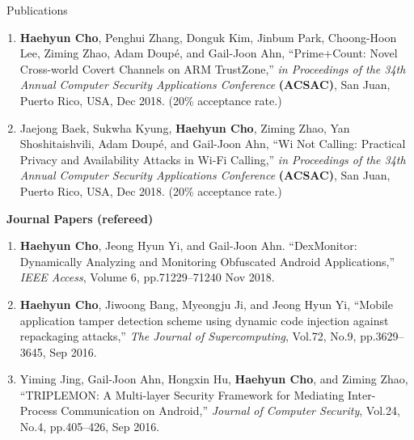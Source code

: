 \documentclass{resume} %
\begin{document}
\begin{rSection}{\faGenderless~Publications}
\begin{enumerate}[leftmargin=0pt]
        \item \textbf{Haehyun Cho}, Penghui Zhang, Donguk Kim, Jinbum Park, Choong-Hoon Lee, Ziming Zhao, Adam Doup\'e, and Gail-Joon Ahn,
		``Prime+Count: Novel Cross-world Covert Channels on ARM TrustZone,'' 
        \emph{in Proceedings of the 34th Annual Computer Security Applications Conference} \textbf{(ACSAC)}, 
		San Juan, Puerto Rico, USA, Dec 2018.
		(20\% acceptance rate.)

		\item Jaejong Baek, Sukwha Kyung, \textbf{Haehyun Cho}, Ziming Zhao, Yan Shoshitaishvili, Adam Doup\'e, and Gail-Joon Ahn,
		``Wi Not Calling: Practical Privacy and Availability Attacks in Wi-Fi Calling,'' 
        \emph{in Proceedings of the 34th Annual Computer Security Applications Conference} \textbf{(ACSAC)}, 
		San Juan, Puerto Rico, USA, Dec 2018.
		(20\% acceptance rate.)

	\end{enumerate}

	\vspace{3mm}
	
    \strut\textbullet~{\bf Journal Papers (refereed)}
    \begin{enumerate}[leftmargin=0pt]
		\item \textbf{Haehyun Cho}, Jeong Hyun Yi, and Gail-Joon Ahn.
        ``DexMonitor: Dynamically Analyzing and Monitoring Obfuscated Android Applications,'' 
        \emph{IEEE Access},
        Volume 6, pp.71229--71240
        Nov 2018.

		\item \textbf{Haehyun Cho}, Jiwoong Bang, Myeongju Ji, and Jeong Hyun Yi, 
		``Mobile application tamper detection scheme using dynamic code injection against repackaging attacks,'' 
		\emph{The Journal of Supercomputing}, 
		Vol.72, No.9, pp.3629--3645, Sep 2016.

		\item Yiming Jing, Gail-Joon Ahn, Hongxin Hu, \textbf{Haehyun Cho}, and Ziming Zhao,
		``TRIPLEMON: A Multi-layer Security Framework for Mediating Inter-Process Communication on Android,'' 
		\emph{Journal of Computer Security}, 
		Vol.24, No.4, pp.405--426, Sep 2016.


\end{enumerate}
\end{rSection}
\end{document}
